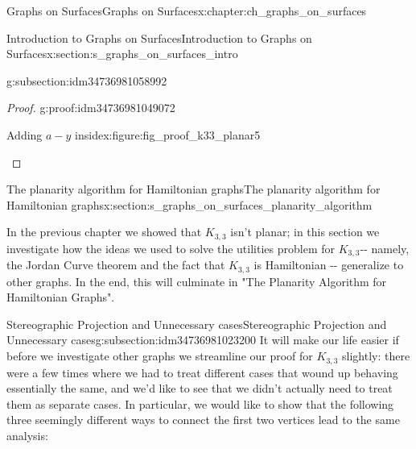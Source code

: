\documentclass[oneside,10pt,]{book}
\numberwithin{equation}{section}
\begin{document}
\begin{chapterptx}{Graphs on Surfaces}{}{Graphs on Surfaces}{}{}{x:chapter:ch_graphs_on_surfaces}
\begin{sectionptx}{Introduction to Graphs on Surfaces}{}{Introduction to Graphs on Surfaces}{}{}{x:section:s_graphs_on_surfaces_intro}
\begin{subsectionptx}{}{}{}{}{}{g:subsection:idm34736981058992}
\begin{proof}{}{g:proof:idm34736981049072}
\begin{figureptx}{Adding \(a-y\) inside}{x:figure:fig_proof_k33_planar5}{}
\begin{image}{0.15}{0.7}{0.15}
{
}%
\end{image}%
\tcblower
\end{figureptx}%
\end{proof}
\end{subsectionptx}
\end{sectionptx}
%
%
\typeout{************************************************}
\typeout{************************************************}
%
\begin{sectionptx}{The planarity algorithm for Hamiltonian graphs}{}{The planarity algorithm for Hamiltonian graphs}{}{}{x:section:s_graphs_on_surfaces_planarity_algorithm}
\begin{introduction}{}%
In the previous chapter we showed that \(K_{3,3}\) isn't planar; in this section we investigate how the ideas we used to solve the utilities problem for \(K_{3,3}\)-{}-{} namely, the Jordan Curve theorem and the fact that \(K_{3,3}\) is Hamiltonian -{}-{} generalize to other graphs.  In the end, this will culminate in "The Planarity Algorithm for Hamiltonian Graphs".%
\end{introduction}%
%
%
\typeout{************************************************}
\typeout{************************************************}
%
\begin{subsectionptx}{Stereographic Projection and Unnecessary cases}{}{Stereographic Projection and Unnecessary cases}{}{}{g:subsection:idm34736981023200}
It will make our life easier if before we investigate other graphs we streamline our proof for \(K_{3,3}\) slightly: there were a few times where we had to treat different cases that wound up behaving essentially the same, and we'd like to see that we didn't actually need to treat them as separate cases.  In particular, we would like to show that the following three seemingly different ways to connect the first two vertices lead to the same analysis:%

\end{subsectionptx}
\end{sectionptx}
\end{chapterptx}
\end{document}
